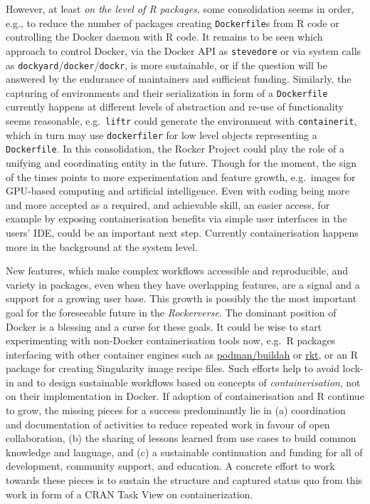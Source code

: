 However, at least \emph{on the level of R packages}, some consolidation
seems in order, e.g., to reduce the number of packages creating
\texttt{Dockerfile}s from R code or controlling the Docker daemon with R
code. It remains to be seen which approach to control Docker, via the
Docker API as \texttt{stevedore} or via system calls as
\texttt{dockyard}/\texttt{docker}/\texttt{dockr}, is more sustainable,
or if the question will be answered by the endurance of maintainers and
sufficient funding. Similarly, the capturing of environments and their
serialization in form of a \texttt{Dockerfile} currently happens at
different levels of abstraction and re-use of functionality seems
reasonable, e.g.~\texttt{liftr} could generate the environment with
\texttt{containerit}, which in turn may use \texttt{dockerfiler} for low
level objects representing a \texttt{Dockerfile}. In this consolidation,
the Rocker Project could play the role of a unifying and coordinating
entity in the future. Though for the moment, the sign of the times
points to more experimentation and feature growth, e.g.~images for
GPU-based computing and artificial intelligence. Even with coding being
more and more accepted as a required, and achievable skill, an easier
access, for example by exposing containerisation benefits via simple
user interfaces in the users' IDE, could be an important next step.
Currently containerisation happens more in the background at the system
level.

New features, which make complex workflows accessible and reproducible,
and variety in packages, even when they have overlapping features, are a
signal and a support for a growing user base. This growth is possibly
the the most important goal for the foreseeable future in the
\emph{Rockerverse}. The dominant position of Docker is a blessing and a
curse for these goals. It could be wise to start experimenting with
non-Docker containerisation tools now, e.g.~R packages interfacing with
other container engines such as
\href{https://github.com/containers/libpod}{podman/buildah} or
\href{https://coreos.com/rkt/}{rkt}, or an R package for creating
Singularity image recipe files. Such efforts help to avoid lock-in and
to design sustainable workflows based on concepts of
\emph{containerisation}, not on their implementation in Docker. If
adoption of containerisation and R continue to grow, the missing pieces
for a success predominantly lie in (a) coordination and documentation of
activities to reduce repeated work in favour of open collaboration, (b)
the sharing of lessons learned from use cases to build common knowledge
and language, and (c) a sustainable continuation and funding for all of
development, community support, and education. A concrete effort to work
towards these pieces is to sustain the structure and captured status quo
from this work in form of a CRAN Task View on containerization.

